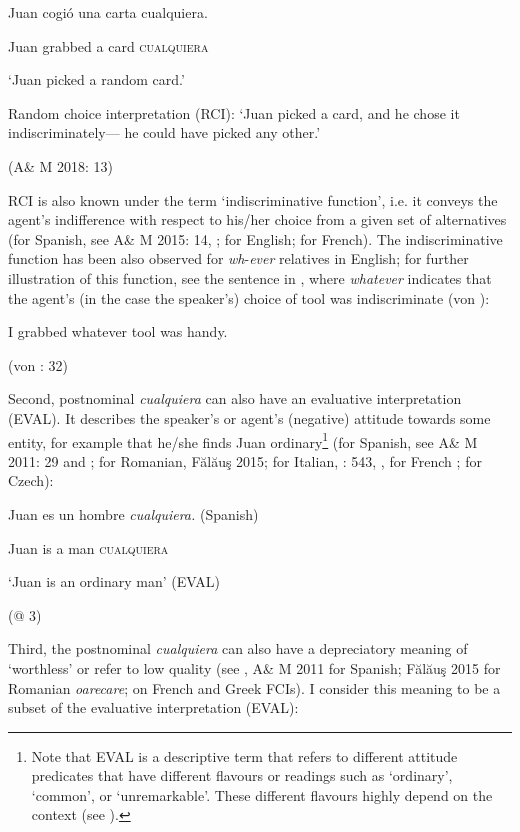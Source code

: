     Juan cogió  una  carta  cualquiera.

    Juan grabbed  a  card  \textsc{cualquiera}

    ‘Juan picked a random card.’

    Random choice interpretation (RCI): ‘Juan picked a card, and he chose it indiscriminately— he could have picked any other.’

    (A\& M 2018: 13)

RCI is also known under the term ‘indiscriminative function’, i.e. it conveys the agent’s indifference with respect to his/her choice from a given set of alternatives (for Spanish, see A\& M 2015: 14, \citealt{Horn2000}; for English; \citealt{Vlachou2007,Vlachou2012} for French). The indiscriminative function has been also observed for \textit{wh}{}-\textit{ever} relatives in English; for further illustration of this function, see the sentence in , where \textit{whatever} indicates that the agent’s (in the case the speaker’s) choice of tool was indiscriminate (von \citealt{Fintel2000}):

    I grabbed whatever tool was handy.   

      (von \citealt{Fintel2000}: 32)

Second, postnominal \textit{cualquiera} can also have an evaluative interpretation (EVAL). It describes the speaker’s or agent’s (negative) attitude towards some entity, for example that he/she finds Juan ordinary\footnote{{Note that EVAL is a descriptive term that refers to different attitude predicates that have different flavours or readings such as ‘ordinary’, ‘common’, or ‘unremarkable’. These different flavours highly depend on the context (see ).}} (for Spanish, see A\& M 2011: 29 and \citealt{Rivero2011}; for Romanian, Fălăuş 2015; for Italian, \citealt{Chierchia2006}: 543, \citealt{Kellert2021}, for French \citealt{Vlachou2007,Vlachou2012}; \citealt{Šimík2008} for Czech):\textstyleFootnoteSymbol{}

    Juan  es  un  hombre  \textit{cualquiera.}  (Spanish)

    Juan  is  a  man  \textsc{cualquiera}  

    ‘Juan is an ordinary man’ (EVAL)

    (@ 3)

Third, the postnominal \textit{cualquiera} can also have a depreciatory meaning of ‘worthless’ or refer to low quality (see \citealt{Rivero2011}, A\& M 2011 for Spanish; Fălăuş 2015 for Romanian \textit{oarecare}; \citealt{Vlachou2007,Vlachou2012} on French and Greek FCIs). I consider this meaning to be a subset of the evaluative interpretation (EVAL):

